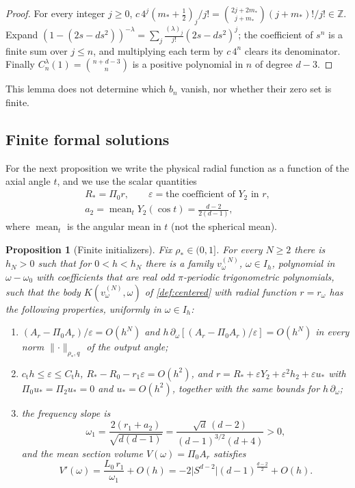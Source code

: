 \documentclass[11pt]{amsart}
\numberwithin{equation}{section}
\newtheorem{proposition}[theorem]{Proposition}
\theoremstyle{definition}
\theoremstyle{remark}
\newcommand{\Z}{\mathbb{Z}}
\newcommand{\eps}{\varepsilon}
\newcommand{\abs}[1]{\lvert #1\rvert}
\newcommand{\norm}[1]{\lVert #1\rVert}
\newcommand{\mean}{\operatorname{mean}}
\begin{document}
\begin{proof}
For every integer $j\ge0$, $c\,4^j(m_*+\frac12)_j/j!=\binom{2j+2m_*}{j+m_*}(j+m_*)!/j!\in\Z$. Expand $(1-(2s-ds^2))^{-\lambda}=\sum_j\frac{(\lambda)_j}{j!}(2s-ds^2)^j$; the coefficient of $s^n$ is a finite sum over $j\le n$, and multiplying each term by $c\,4^n$ clears its denominator. Finally $C_n^\lambda(1)=\binom{n+d-3}{n}$ is a positive polynomial in $n$ of degree $d-3$.
\end{proof}

This lemma does not determine which $b_n$ vanish, nor whether their zero set is finite.

\subsection{Finite formal solutions}
For the next proposition we write the physical radial function as a function of the axial angle $t$, and we use the scalar quantities
\begin{gather*}
R_*=\Pi_0r,\qquad \eps=\text{the coefficient of $Y_2$ in $r$},\\
a_2=\mean_tY_2(\cos t)=\frac{d-2}{2(d-1)},
\end{gather*}
where $\mean_t$ is the angular mean in $t$ (not the spherical mean).

\begin{proposition}[Finite initializers]\label{prop:init}
Fix $\rho_*\in(0,1]$. For every $N\ge2$ there is $h_N>0$ such that for $0<h<h_N$ there is a family $v^{(N)}_\omega$, $\omega\in I_h$, polynomial in $\omega-\omega_0$ with coefficients that are real odd $\pi$-periodic trigonometric polynomials, such that the body $K(v^{(N)}_\omega,\omega)$ of \cref{def:centered} with radial function $r=r_\omega$ has the following properties, uniformly in $\omega\in I_h$:
\begin{enumerate}[label=\textup{(\roman*)}]
\item $(A_r-\Pi_0A_r)/\eps=O(h^N)$ and $h\,\partial_\omega[(A_r-\Pi_0A_r)/\eps]=O(h^N)$ in every norm $\norm\cdot_{\rho_*,q}$ of the output angle;
\item $c_{\mathrm t}h\le\eps\le C_{\mathrm t}h$, $R_*-R_0-r_1\eps=O(h^2)$, and $r=R_*+\eps Y_2+\eps^2h_2+\eps u_*$ with $\Pi_0u_*=\Pi_2u_*=0$ and $u_*=O(h^2)$, together with the same bounds for $h\,\partial_\omega$;
\item the frequency slope is
\[
\omega_1=\frac{2(r_1+a_2)}{\sqrt{d(d-1)}}=\frac{\sqrt d\,(d-2)}{(d-1)^{3/2}(d+4)}>0,
\]
and the mean section volume $V(\omega)=\Pi_0A_r$ satisfies
\begin{equation}\label{eq:Vslope}
V'(\omega)=\frac{L_0\,r_1}{\omega_1}+O(h)=-2\abs{S^{d-2}}(d-1)^{\frac{d-2}2}+O(h).
\end{equation}
\end{enumerate}
\end{proposition}
\end{document}
